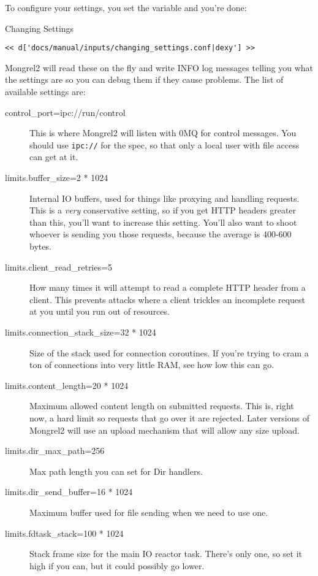 To configure your settings, you set the variable  and you're done:

\begin{code}{Changing Settings}
\begin{lstlisting}
<< d['docs/manual/inputs/changing_settings.conf|dexy'] >>
\end{lstlisting}
\end{code}

Mongrel2 will read these on the fly and write INFO log messages telling you
what the settings are so you can debug them if they cause problems.  The list
of available settings are:

\begin{description}
\item[control\_port=ipc://run/control] This is where Mongrel2 will listen with 0MQ for control messages.  You should use \verb|ipc://| for the spec, so that only a local user with file access can get at it.
\item[limits.buffer\_size=2 * 1024] Internal IO buffers, used for things like proxying and handling requests.  This is a \emph{very} conservative setting, so if you get HTTP headers greater than this, you'll want to increase this setting.  You'll also want to shoot whoever is sending you those requests, because the average is 400-600 bytes.
\item[limits.client\_read\_retries=5] How many times it will attempt to read a complete HTTP header from a client. This prevents attacks where a client trickles an incomplete request at you until you run out of resources.
\item[limits.connection\_stack\_size=32 * 1024] Size of the stack used for connection coroutines.  If you're trying to cram a ton of connections into very little RAM, see how low this can go.
\item[limits.content\_length=20 * 1024] Maximum allowed content length on submitted requests.  This is, right now, a hard limit so requests that go over it are rejected.  Later versions of Mongrel2 will use an upload mechanism that will allow any size upload.
\item[limits.dir\_max\_path=256] Max path length you can set for Dir handlers.
\item[limits.dir\_send\_buffer=16 * 1024] Maximum buffer used for file sending when we need to use one.
\item[limits.fdtask\_stack=100 * 1024] Stack frame size for the main IO reactor task.  There's only one, so set it high if you can, but it could possibly go lower.

\end{description}
